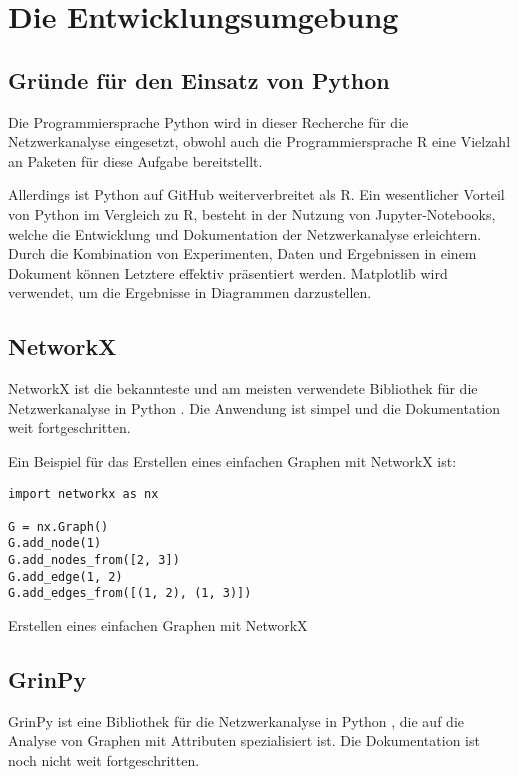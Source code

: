 \section{Die Entwicklungsumgebung}

\subsection{Gründe für den Einsatz von Python}

Die Programmiersprache Python wird in dieser Recherche für die Netzwerkanalyse eingesetzt, obwohl auch die Programmiersprache R eine Vielzahl an Paketen für diese Aufgabe bereitstellt.

Allerdings ist Python auf GitHub weiterverbreitet als R.
Ein wesentlicher Vorteil von Python im Vergleich zu R, besteht in der Nutzung von Jupyter-Notebooks, welche die Entwicklung und Dokumentation der Netzwerkanalyse erleichtern.
Durch die Kombination von Experimenten, Daten und Ergebnissen in einem Dokument können Letztere effektiv präsentiert werden.
Matplotlib wird verwendet, um die Ergebnisse in Diagrammen darzustellen.

\subsection{NetworkX}

NetworkX ist die bekannteste und am meisten verwendete Bibliothek für die Netzwerkanalyse in Python \cite{hagberg_exploring_2008}.
Die Anwendung ist simpel und die Dokumentation weit fortgeschritten.

Ein Beispiel für das Erstellen eines einfachen Graphen mit NetworkX ist:

\begin{listing}[H]
    \begin{verbatim}
import networkx as nx

G = nx.Graph()
G.add_node(1)
G.add_nodes_from([2, 3])
G.add_edge(1, 2)
G.add_edges_from([(1, 2), (1, 3)])
    \end{verbatim}
    \caption{Erstellen eines einfachen Graphen mit NetworkX}
\end{listing}

\subsection{GrinPy}

GrinPy ist eine Bibliothek für die Netzwerkanalyse in Python \cite{amos_grinpy_2022}, die auf die Analyse von Graphen mit Attributen spezialisiert ist.
Die Dokumentation ist noch nicht weit fortgeschritten.

